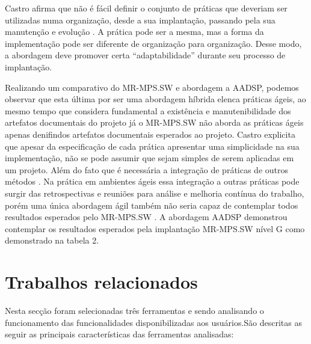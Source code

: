 \documentclass{acm_proc_article-sp}
\begin{document}
Castro afirma que não é fácil definir o conjunto de práticas que deveriam ser utilizadas numa organização, desde a sua implantação, passando pela sua manutenção e evolução \cite{Castro:melhoria}. A prática pode ser a mesma, mas a forma da implementação pode ser diferente de organização para organização. Desse modo, a abordagem deve promover certa “adaptabilidade” durante seu processo de implantação. 

Realizando um comparativo do MR-MPS.SW e abordagem a AADSP, podemos observar que esta última por ser uma abordagem híbrida elenca práticas ágeis, ao mesmo tempo que considera fundamental a existência e manutenibilidade dos artefatos documentais do projeto já o MR-MPS.SW não aborda as práticas ágeis apenas denifindos artefatos documentais esperados ao projeto. Castro explicita que apesar da especificação de cada prática apresentar uma simplicidade na sua implementação, não se pode assumir que sejam simples de serem aplicadas em um projeto. Além do fato que é necessária a integração de práticas de outros métodos \cite{Castro:melhoria}. Na prática em ambientes ágeis essa integração a outras práticas pode surgir das retrospectivas e reuniões para análise e melhoria contínua do trabalho, porém uma única abordagem ágil também não seria capaz de contemplar todos resultados esperados pelo MR-MPS.SW \cite{Castro:melhoria}. A abordagem AADSP demonstrou contemplar os resultados esperados pela implantação MR-MPS.SW nível G como demonstrado na tabela 2.


\section{Trabalhos relacionados}
Nesta secção foram selecionadas três ferramentas e sendo analisando o funcionamento das funcionalidades disponibilizadas aos usuários.São descritas as seguir as principais características das ferramentas analisadas:
\end{document}
